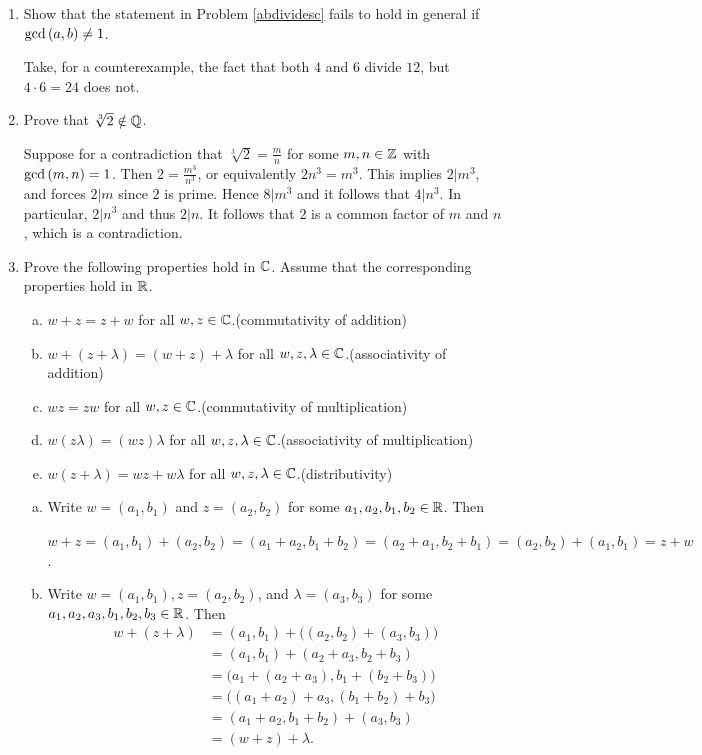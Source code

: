 \documentclass[11pt,fleqn,dvipsnames,usenames]{article}
\begin{document}
\begin{enumerate}
\item Show that the statement in Problem \ref{abdividesc} fails to hold in general if $\text{gcd}\left(a,b\right)\neq 1$.
\vsmsp

\solution Take, for a counterexample, the fact that both $4$ and $6$ divide $12$, but $4\cdot 6 = 24$ does not.

\item Prove that $\sqrt[3]{2}\notin\mathbb{Q}$.
\vsmsp

\solution Suppose for a contradiction that $\sqrt[3]{2} = \frac{m}{n}$ for some $m,n\in\mathbb{Z}$ with $\text{gcd}\left(m,n\right)=1$.  Then $2 = \frac{m^3}{n^3}$, or equivalently $2n^3 = m^3$.  This implies $2|m^3$, and forces $2|m$ since $2$ is prime.  Hence $8|m^3$ and it follows that $4|n^3$.  In particular, $2|n^3$ and thus $2|n$.  It follows that $2$ is a common factor of $m$ and $n$, which is a contradiction.

\item Prove the following properties hold in $\mathbb{C}$.  Assume that the corresponding properties hold in $\mathbb{R}$.
\begin{enumerate}[(a)]
\item $w + z = z + w$ for all $w,z\in\mathbb{C}$.\hfill (commutativity of addition)
\item $w + (z + \lambda) = (w + z) + \lambda$ for all $w,z,\lambda\in\mathbb{C}$.\hfill (associativity of addition)
\item $wz = zw$ for all $w,z\in\mathbb{C}$.\hfill (commutativity of multiplication)
\item $w(z\lambda) = (wz)\lambda$ for all $w,z,\lambda\in\mathbb{C}$.\hfill (associativity of multiplication)
\item $w(z + \lambda) = wz + w\lambda$ for all $w,z,\lambda\in\mathbb{C}$.\hfill (distributivity)
\end{enumerate}
\vsmsp

\solution 
\begin{enumerate}[(a)]
\item Write $w = (a_{1},b_{1})$ and $z = (a_{2},b_{2})$ for some $a_{1},a_{2},b_{1},b_{2}\in\mathbb{R}$.  Then
\begin{center}
$w + z = (a_{1},b_{1}) + (a_{2},b_{2}) = (a_{1} + a_{2}, b_{1} + b_{2}) = (a_{2} + a_{1}, b_{2} + b_{1}) = (a_{2},b_{2}) + (a_{1},b_{1}) = z + w$.
\end{center}

\item Write $w = (a_{1},b_{1}), z = (a_{2},b_{2})$, and $\lambda = (a_{3},b_{3})$ for some $a_{1},a_{2},a_{3},b_{1},b_{2},b_{3}\in\mathbb{R}$.  Then
\begin{align*}
w + (z + \lambda) &= (a_{1},b_{1}) + \big((a_{2},b_{2}) + (a_{3},b_{3})\big)\\
&= (a_{1},b_{1}) + (a_{2} + a_{3},b_{2}+b_{3})\\
&= \big(a_{1} + (a_{2} + a_{3}), b_{1} + (b_{2}+b_{3})\big)\\
&= \big((a_{1} + a_{2}) + a_{3}, (b_{1} + b_{2})+b_{3}\big)\\
&= (a_{1} + a_{2}, b_{1} + b_{2}) + (a_{3},b_{3})\\
&= (w + z) + \lambda.
\end{align*}


\end{enumerate}
\end{enumerate}
\end{document}
